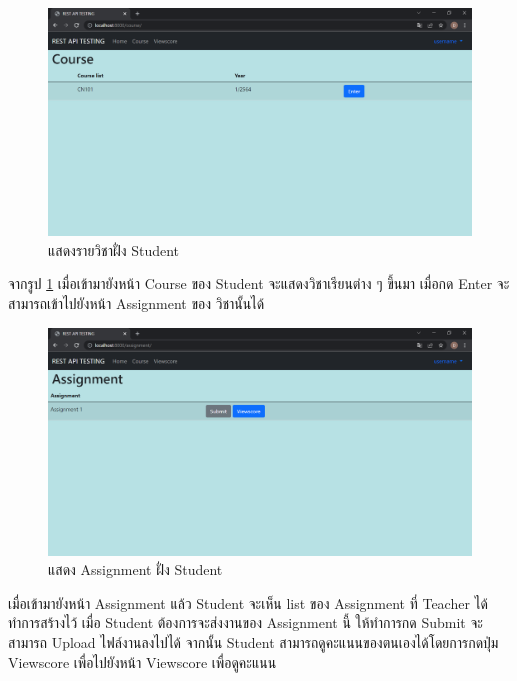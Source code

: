 \begin{figure}[H]
    \captionsetup{justification=centering}
    \centering
    \includegraphics[width=5in]{figures/chapter4/coursestudent.PNG}
    \caption{แสดงรายวิชาฝั่ง Student}
    \label{figure:course3}
\end{figure}
จากรูป \ref{figure:course3} เมื่อเข้ามายังหน้า Course ของ Student จะแสดงวิชาเรียนต่าง ๆ ขึ้นมา เมื่อกด Enter จะสามารถเข้าไปยังหน้า Assignment ของ วิชานั้นได้
\newpage

\begin{figure}[H]
    \captionsetup{justification=centering}
    \centering
    \includegraphics[width=5in]{figures/chapter4/assignstudent.PNG}
    \caption{แสดง Assignment ฝั่ง Student}
    \label{figure:assignment}
\end{figure}
เมื่อเข้ามายังหน้า Assignment แล้ว Student จะเห็น list ของ Assignment ที่ Teacher ได้ทำการสร้างไว้ เมื่อ Student ต้องการจะส่งงานของ Assignment นี้ ให้ทำการกด Submit จะสามารถ Upload ไฟล์งานลงไปได้ จากนั้น Student สามารถดูคะแนนของตนเองได้โดยการกดปุ่ม Viewscore เพื่อไปยังหน้า Viewscore เพื่อดูคะแนน

